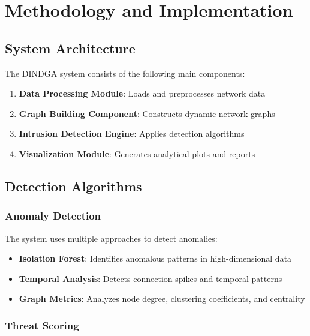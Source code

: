 \documentclass[12pt,a4paper]{report}
\begin{document}
\chapter{Methodology and Implementation}

\section{System Architecture}

The DINDGA system consists of the following main components:

\begin{enumerate}
    \item \textbf{Data Processing Module}: Loads and preprocesses network data
    \item \textbf{Graph Building Component}: Constructs dynamic network graphs
    \item \textbf{Intrusion Detection Engine}: Applies detection algorithms
    \item \textbf{Visualization Module}: Generates analytical plots and reports
\end{enumerate}

\section{Detection Algorithms}

\subsection{Anomaly Detection}

The system uses multiple approaches to detect anomalies:

\begin{itemize}
    \item \textbf{Isolation Forest}: Identifies anomalous patterns in high-dimensional data
    \item \textbf{Temporal Analysis}: Detects connection spikes and temporal patterns
    \item \textbf{Graph Metrics}: Analyzes node degree, clustering coefficients, and centrality
\end{itemize}

\subsection{Threat Scoring}
\end{document}

